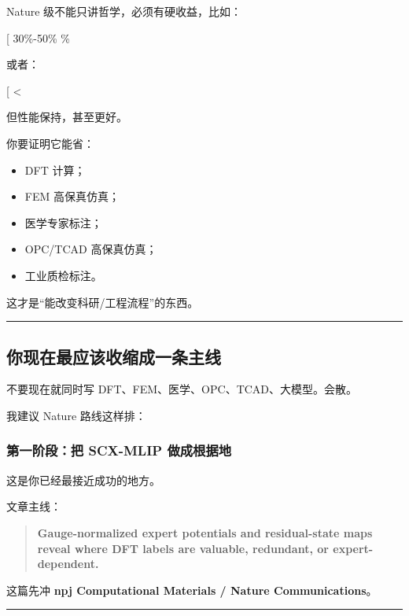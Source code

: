 \documentclass[
  12pt,
]{ctexart}
\providecommand{\tightlist}{%
  \setlength{\itemsep}{0pt}\setlength{\parskip}{0pt}}
\begin{document}
Nature 级不能只讲哲学，必须有硬收益，比如：

{[} 30\%-50\%  \% \text{ full-data performance}{]}

或者：

{[}  \textless{}
\text{uniform high-fidelity simulation cost}{]}

但性能保持，甚至更好。

你要证明它能省：

\begin{itemize}
\tightlist
\item
  DFT 计算；
\item
  FEM 高保真仿真；
\item
  医学专家标注；
\item
  OPC/TCAD 高保真仿真；
\item
  工业质检标注。
\end{itemize}

这才是``能改变科研/工程流程''的东西。

\begin{center}\rule{0.5\linewidth}{0.5pt}\end{center}

\subsection{你现在最应该收缩成一条主线}\label{ux4f60ux73b0ux5728ux6700ux5e94ux8be5ux6536ux7f29ux6210ux4e00ux6761ux4e3bux7ebf}

不要现在就同时写 DFT、FEM、医学、OPC、TCAD、大模型。会散。

我建议 Nature 路线这样排：

\subsubsection{第一阶段：把 SCX-MLIP
做成根据地}\label{ux7b2cux4e00ux9636ux6bb5ux628a-scx-mlip-ux505aux6210ux6839ux636eux5730}

这是你已经最接近成功的地方。

文章主线：

\begin{quote}
\textbf{Gauge-normalized expert potentials and residual-state maps
reveal where DFT labels are valuable, redundant, or expert-dependent.}
\end{quote}

这篇先冲 \textbf{npj Computational Materials / Nature Communications}。

\begin{center}\rule{0.5\linewidth}{0.5pt}\end{center}
\end{document}
